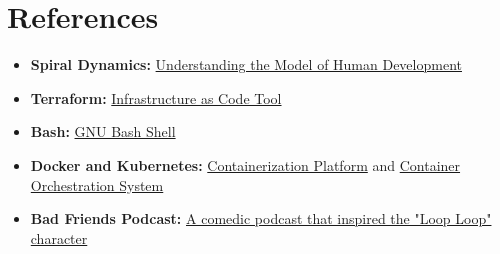 \documentclass[../../main.tex]{subfiles}
\begin{document}
    \section*{References}

    \begin{itemize}
        \item \textbf{Spiral Dynamics:} \href{https://en.wikipedia.org/wiki/Spiral_Dynamics}{Understanding the Model of Human Development}
        \item \textbf{Terraform:} \href{https://www.hashicorp.com/products/terraform}{Infrastructure as Code Tool}
        \item \textbf{Bash:} \href{https://www.gnu.org/software/bash/}{GNU Bash Shell}
        \item \textbf{Docker and Kubernetes:} \href{https://www.docker.com/}{Containerization Platform} and \href{https://kubernetes.io/}{Container Orchestration System}
        \item \textbf{Bad Friends Podcast:} \href{https://www.youtube.com/channel/UC3e8IMJ8R5fp8xCXmciZQpQ}{A comedic podcast that inspired the "Loop Loop" character}
    \end{itemize}
\end{document}
